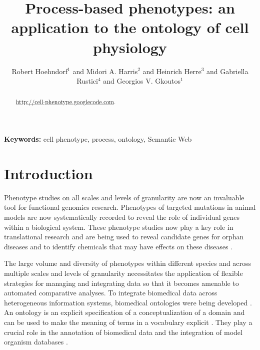 \documentclass{bioinfo}
\renewcommand{\cite}{\citep}
\begin{document}

\title{Process-based phenotypes: an application to the ontology of
  cell physiology}

\author[Hoehndorf et al.]{Robert Hoehndorf$^1$ and Midori
  A. Harris$^2$ and Heinrich Herre$^3$ and Gabriella Rustici$^4$ and
  Georgios V. Gkoutos$^{1}$}

\address{$^{1}$Department of Genetics, University of Cambridge,
  Downing Street, Cambridge, Cambridge CB2 3EH, UK\\
  $^{2}$Department of Biochemistry; University of Cambridge, 80 Tennis
  Court Road, Cambridge CB2 1GA, UK\\
  $^{3}$Institute for Medical Informatics, Statistics and
  Epidemiology, University of Leipzig, Haertelstrasse 16-18, 04107
  Leipzig, Germany\\
  $^{4}$EBI, Wellcome Trust Genome Campus, Hinxton, Cambridge,
  Cambridge CB10 1SD, UK
}

\maketitle
 
\begin{abstract}

  \url{http://cell-phenotype.googlecode.com}.
\end{abstract}

{\bf Keywords:} cell phenotype, process, ontology, Semantic Web

\section{Introduction}
Phenotype studies on all scales and levels of granularity are now an
invaluable tool for functional genomics research. Phenotypes of
targeted mutations in animal models are now systematically recorded to
reveal the role of individual genes within a biological system. These
phenotype studies now play a key role in translational research and
are being used to reveal candidate genes for orphan diseases and to
identify chemicals that may have effects on these diseases
\cite{Schofield2011}.

The large volume and diversity of phenotypes within different species
and across multiple scales and levels of granularity necessitates the
application of flexible strategies for managing and integrating data
so that it becomes amenable to automated comparative analyses. To
integrate biomedical data across heterogeneous information systems,
biomedical ontologies were being developed \cite{Smith2007}. An
ontology is an explicit specification of a conceptualization of a
domain and can be used to make the meaning of terms in a vocabulary
explicit \cite{Gruber1995, Guarino1998}. They play a crucial role in
the annotation of biomedical data and the integration of model
organism databases \cite{go2010, Bada2004, goble}.
\end{document}
